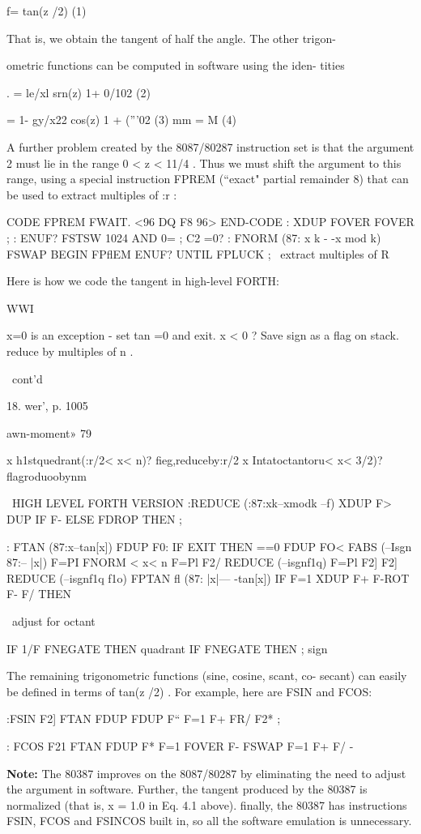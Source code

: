 {{{{f= tan(z /2) (1)

That is, we obtain the tangent of half the angle. The other trigon-

ometric functions can be computed in software using the iden-
tities

. = le/xl
srn(z) 1+ 0/102 (2)

= 1- gy/x22
cos(z) 1 + (”’02 (3)
mm = M (4)

A further problem created by the 8087/80287 instruction set is
that the argument 2 must lie in the range 0 < z < 11/4 . Thus we
must shift the argument to this range, using a special instruction
FPREM (“exact" partial remainder 8) that can be used to extract
multiples of :r :

CODE FPREM FWAIT. <96 DQ F8 96> END-CODE
: XDUP FOVER FOVER ;
: ENUF? FSTSW 1024 AND 0= ; \bit C2 =0?
: FNORM (87: x k - -x mod k) FSWAP
BEGIN FPflEM ENUF? UNTIL FPLUCK ;
\ extract multiples of R

Here is how we code the tangent in high-level FORTH:

WWI

x=0 is an exception - set tan =0 and exit.
x < 0 ? Save sign as a flag on stack.
reduce by multiples of n .

\ cont'd

 

18. wer', p. 1005

awn-moment» 79

x h1stquedrant(:r/2< x< n)? fieg,reduceby:r/2
x Intatoctantoru< x< 3/2)? flagroduoobynm

\ HIGH LEVEL FORTH VERSION
:REDUCE (:87:xk--xmodk --f)
XDUP F> DUP IF F- ELSE FDROP THEN ;

: FTAN (87:x--tan[x]) FDUP F0:
IF EXIT THEN \tan==0
FDUP FO< FABS (--Isgn 87:-- |x|)
F=PI FNORM \0< x< n
F=Pl F2/ REDUCE (--isgnf1q)
F=Pl F2] F2] REDUCE (--isgnf1q f1o)
FPTAN fl (87: |x|— -tan[x])
IF F=1 XDUP F+ F-ROT F- F/ THEN

\ adjust for octant

IF 1/F FNEGATE THEN \adjustfor quadrant
IF FNEGATE THEN ; \adjust sign

The remaining trigonometric functions (sine, cosine, scant, co-
secant) can easily be defined in terms of tan(z /2) . For example,
here are FSIN and FCOS:

:FSIN F2] FTAN FDUP FDUP F“ F=1 F+
FR/ F2* ;

: FCOS F21 FTAN FDUP F* F=1 FOVER F-
FSWAP F=1 F+ F/ -

\textbf{Note:} The 80387 improves on the 8087/80287 by eliminating the
need to adjust the argument in software. Further, the tangent
produced by the 80387 is normalized (that is, x = 1.0 in Eq. 4.1
above). finally, the 80387 has instructions FSIN, FCOS and
FSINCOS built in, so all the software emulation is unnecessary.

}}}}
